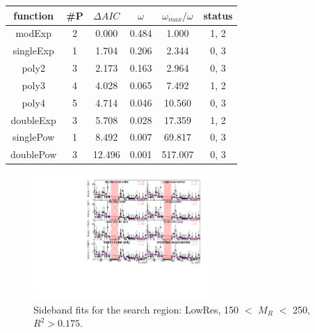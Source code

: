 \begin{table}[h] 
\begin{center} 
\begin{tabular}{|c|c|ccc|c|} 
\hline function & \#P & $\Delta AIC$ & $\omega$ & $\omega_{max}/\omega$ & status \\ \hline 
\rowcolor[rgb]{0.31,0.78,0.47}  
modExp &  2 &  0.000 &  0.484 &  1.000 &  1,  2 \\ 
\rowcolor[rgb]{0.31,0.78,0.47}  
singleExp &  1 &  1.704 &  0.206 &  2.344 &  0,  3 \\ 
\rowcolor[rgb]{0.31,0.78,0.47}  
poly2 &  3 &  2.173 &  0.163 &  2.964 &  0,  3 \\ 
\rowcolor[rgb]{1.0,0.41,0.38}  
poly3 &  4 &  4.028 &  0.065 &  7.492 &  1,  2 \\ 
\rowcolor[rgb]{1.0,0.41,0.38}  
poly4 &  5 &  4.714 &  0.046 & 10.560 &  0,  3 \\ 
\rowcolor[rgb]{1.0,0.41,0.38}  
doubleExp &  3 &  5.708 &  0.028 & 17.359 &  1,  2 \\ 
\rowcolor[rgb]{1.0,0.41,0.38}  
singlePow &  1 &  8.492 &  0.007 & 69.817 &  0,  3 \\ 
\rowcolor[rgb]{1.0,0.41,0.38}  
doublePow &  3 & 12.496 &  0.001 & 517.007 &  0,  3 \\ 
\hline 
\end{tabular} 
\label{tab:AICresults2} 
\end{center} 
\end{table} 

\begin{figure}[h] 
\begin{center} 
\includegraphics[width=0.6\textwidth]{hgg/lowres/150_0d175.pdf} 
\caption{Sideband fits for the search region: LowRes, 150 $<$ $M_R$
  $<$ 250\GeV, $R^2 > 0.175$.} 
\label{fig:AICresults3} 
\end{center} 
\end{figure} 


